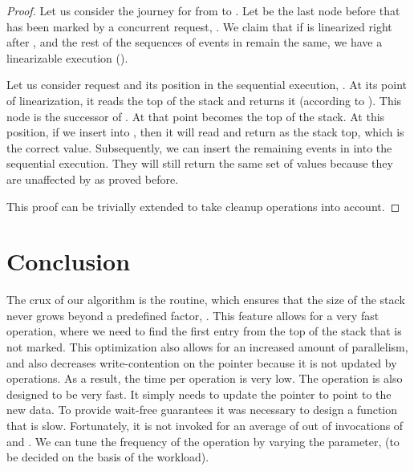 \documentclass{llncs}
\begin{document}
\begin{proof}
Let us consider the journey for  from  to . Let  be the last node before  that has been
marked by a concurrent request, . We claim that if  is linearized right after , and the rest of the
sequences of events in  remain the same, we have a linearizable execution (). 

Let us consider request  and its position in the sequential execution, . At its point of
linearization, it reads the top of the stack and returns it (according to ). This node 
is the successor of . At that point  becomes the top of the stack. At this position, if we insert
 into , then it will read and return  as the stack top, which is the correct value. Subsequently,
we can insert the remaining events in  into the sequential execution. They will still return the same set
of values because they are unaffected by  as proved before. 

This proof can be trivially extended to take cleanup operations into account. 
\end{proof}







\section{Conclusion}
The crux of our algorithm is the  routine, which ensures that the size of the 
stack never grows beyond a predefined factor, . This feature allows for
a very fast  operation, where we need to find the first entry from the top of the
stack that is not marked. This optimization also allows for an increased amount of parallelism, and
also decreases write-contention on the  pointer because it is not updated by  operations. 
As a result, the time 
per  operation is very low. The  operation is also designed to be very fast. It simply
needs to update the  pointer to point to the new data. To provide wait-free guarantees
it was necessary to design a  function that is slow.
Fortunately, it is not invoked for an average of  out of  invocations of  and . 
We can tune the frequency of the  operation by varying
the parameter,  (to be decided on the basis of the workload). 
\end{document}
